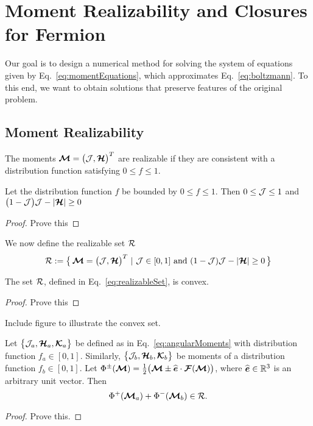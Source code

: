 \section{Moment Realizability and Closures for Fermion}
\label{sec:realizability}

Our goal is to design a numerical method for solving the system of equations given by Eq.~\eqref{eq:momentEquations}, which approximates Eq.~\eqref{eq:boltzmann}.  
To this end, we want to obtain solutions that preserve features of the original problem.  

\subsection{Moment Realizability}

\begin{define}
  The moments $\boldsymbol{\mathcal{M}}=\big(\mathcal{J},\boldsymbol{\mathcal{H}}\big)^{T}$ are realizable if they are consistent with a distribution function satisfying $0\le f \le 1$.
\end{define}
\begin{lemma}
  Let the distribution function $f$ be bounded by $0\le f \le1$.  
  Then $0\le\mathcal{J}\le1$ and $\big(1-\mathcal{J}\big)\mathcal{J}-|\boldsymbol{\mathcal{H}}|\ge0$
\end{lemma}
\begin{proof}
  Prove this
\end{proof}

We now define the realizable set $\mathcal{R}$
\begin{equation}
  \mathcal{R}:=\big\{\,\boldsymbol{\mathcal{M}}=\big(\mathcal{J},\boldsymbol{\mathcal{H}}\big)^{T}~|~\mathcal{J}\in[0,1]~\text{and}~(1-\mathcal{J})\mathcal{J}-|\boldsymbol{\mathcal{H}}|\ge0\,\big\}
  \label{eq:realizableSet}
\end{equation}

\begin{lemma}
  The set $\mathcal{R}$, defined in Eq.~\eqref{eq:realizableSet}, is convex.  
\end{lemma}
\begin{proof}
  Prove this
\end{proof}

Include figure to illustrate the convex set.  

\begin{lemma}
  Let $\big\{\mathcal{J}_{a},\boldsymbol{\mathcal{H}}_{a},\boldsymbol{\mathcal{K}}_{a}\big\}$ be defined as in Eq.~\eqref{eq:angularMoments} with distribution function $f_{a}\in[0,1]$.  
  Similarly, $\big\{\mathcal{J}_{b},\boldsymbol{\mathcal{H}}_{b},\boldsymbol{\mathcal{K}}_{b}\big\}$ be moments of a distribution function $f_{b}\in[0,1]$.  
  Let $\Phi^{\pm}(\boldsymbol{\mathcal{M}})=\frac{1}{2}\big(\boldsymbol{\mathcal{M}}\pm\widehat{\boldsymbol{e}}\cdot\boldsymbol{\mathcal{F}}(\boldsymbol{\mathcal{M}})\big)$, where $\widehat{\boldsymbol{e}}\in\mathbb{R}^{3}$ is an arbitrary unit vector.  
  Then
  \begin{equation}
    \Phi^{+}(\boldsymbol{\mathcal{M}}_{a})+\Phi^{-}(\boldsymbol{\mathcal{M}}_{b})\in\mathcal{R}.
  \end{equation}
\end{lemma}
\begin{proof}
  Prove this.
\end{proof}

